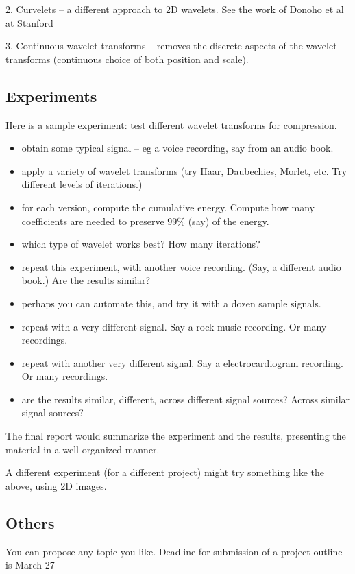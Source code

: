 \documentclass[12pt]{article}
\begin{document}
2. Curvelets -- a different approach to 2D wavelets. See the work of Donoho et al at Stanford

3. Continuous wavelet transforms -- removes the discrete aspects of the wavelet transforms (continuous choice of both position and scale). 


\subsection{Experiments}
Here is a sample experiment: test different wavelet transforms for compression.
\begin{itemize}
\item obtain some typical signal -- eg a voice recording, say from an audio book.
\item apply a variety of wavelet transforms (try Haar, Daubechies, Morlet, etc. Try different levels of iterations.)
\item for each version, compute the cumulative energy. Compute how many coefficients are needed to preserve 99\% (say) of the energy.
\item which type of wavelet works best? How many iterations?
\item repeat this experiment, with another voice recording. (Say, a different audio book.) Are the results similar?
\item perhaps you can automate this, and try it with a dozen sample signals. 
\item repeat with a very different signal. Say a rock music recording. Or many recordings. 
\item repeat with another very different signal. Say a electrocardiogram recording. Or many recordings. 
\item are the results similar, different, across different signal sources? Across similar signal sources?
\end{itemize}
The final report would summarize the experiment and the results, presenting the material in a well-organized manner.

A different experiment (for a different project) might try something like the above, using 2D images.

\subsection{Others}
You can propose any topic you like. Deadline for submission of a project outline is March 27
\end{document}
